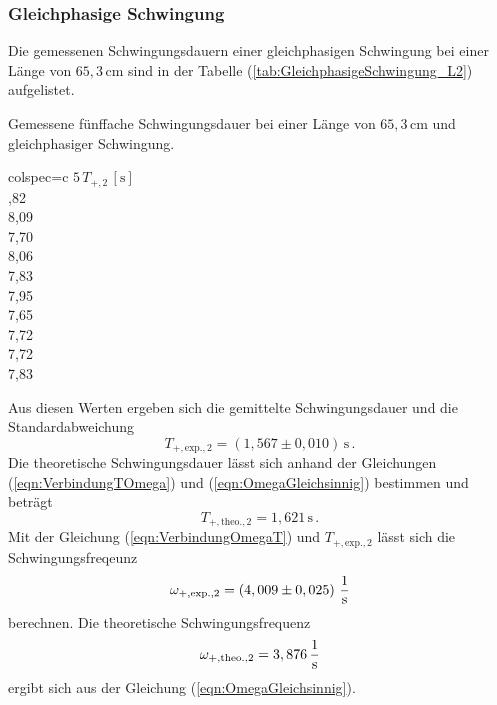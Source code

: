 \subsubsection{Gleichphasige Schwingung}
\label{sec:GleichphasigeSchwingung_LangesPendel}
Die gemessenen Schwingungsdauern einer gleichphasigen Schwingung bei einer Länge von $65,3\, \unit{\centi\meter}$ sind in der Tabelle (\ref{tab:GleichphasigeSchwingung_L2})
aufgelistet. 
\begin{table}[H]
  \centering
  \caption{Gemessene fünffache Schwingungsdauer bei einer Länge von $65,3\, \unit{\centi\meter}$ und gleichphasiger Schwingung.}
  \label{tab:GleichphasigeSchwingung_L2}
  \begin{tblr}{colspec={c}}
      \toprule
      $5\, T_{+, 2}\,\left[\unit{\second}\right]$\\
      ,82 \\
      8,09 \\
      7,70 \\
      8,06 \\
      7,83 \\
      7,95 \\
      7,65 \\
      7,72 \\
      7,72 \\
      7,83 \\
      \bottomrule
  \end{tblr}
\end{table}
Aus diesen Werten ergeben sich die gemittelte Schwingungsdauer und die Standardabweichung
$$T_{+,\text{exp.},2} = \left( 1,567 \pm 0,010 \right)\, \unit{\second}\,.$$
Die theoretische Schwingungsdauer lässt sich anhand der Gleichungen (\ref{eqn:VerbindungTOmega}) und (\ref{eqn:OmegaGleichsinnig}) bestimmen und beträgt
$$T_{+,\text{theo.},2} = 1,621\, \unit{\second}\,.$$
Mit der Gleichung (\ref{eqn:VerbindungOmegaT}) und $T_{+,\text{exp.},2}$ lässt sich die Schwingungsfreqeunz
$$\omega_{+,\text{exp.},2} = \left( 4,009 \pm 0,025 \right)\, \unit[per-mode=fraction]{\per\second}$$ berechnen. 
Die theoretische Schwingungsfrequenz
$$\omega_{+,\text{theo.},2} = 3,876 \, \unit[per-mode=fraction]{\per\second}$$ ergibt sich aus der Gleichung (\ref{eqn:OmegaGleichsinnig}).

%
%
